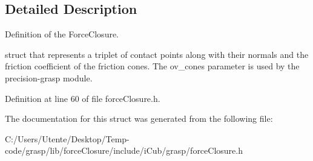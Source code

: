 \subsection{Detailed Description}
Definition of the Force\+Closure. 

struct that represents a triplet of contact points along with their normals and the friction coefficient of the friction cones. The ov\+\_\+cones parameter is used by the precision-\/grasp module. 

Definition at line 60 of file force\+Closure.\+h.



The documentation for this struct was generated from the following file\+:\begin{DoxyCompactItemize}
\item 
C\+:/\+Users/\+Utente/\+Desktop/\+Temp-\/code/grasp/lib/force\+Closure/include/i\+Cub/grasp/force\+Closure.\+h\end{DoxyCompactItemize}
